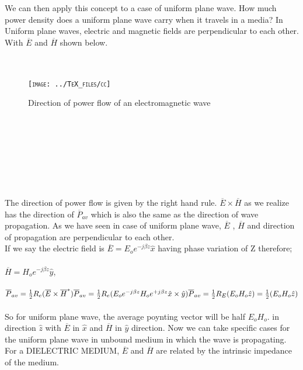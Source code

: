 We can then apply this concept to a case of uniform plane wave. How much power density does a uniform plane wave carry when it travels in a media? In Uniform plane waves, electric and magnetic fields are perpendicular to each other. With $ \overline{E} $ and $ \overline{H} $ shown below.\\\\\\ \begin{figure}[h]
	\centering
	\textsc{\texttt{[image: ../TeX\_files/cc]}}
	\vspace{-10pt}
	\caption{Direction of power flow of an electromagnetic wave}
\end{figure}\\\\\\\\\\\\\\The direction of power flow is given by the right hand rule. $ \overline{E}\times\overline{H} $ as we realize has the direction of $ \overline{P}_{av} $ which is also the same as the direction of wave propagation. As we have seen in case of uniform plane wave, $ \overline{E} $ , $ \overline{H} $ and direction of propagation are perpendicular to each other.\\If we say the electric field is $ \overline{E}=E_{o}e^{-j\beta z}\hat{x} $ having phase variation of Z therefore;\\\\
 $ \overline{H}=H_{o}e^{-j\beta z}\hat{y} $,\\\\ $ \overline{P}_{av}=\frac{1}{2}R_{e}(\overline{E}\times\overline{H}^{*})\\\overline{P}_{av}=\frac{1}{2}R_{e}(E_{o}e^{-j\beta z}H_{o}e^{+j\beta z}\hat{x}\times\hat{y})\\\overline{P}_{av}=\frac{1}{2}R_{E}(E_{o}H_{o}\hat{z})=\frac{1}{2}(E_{o}H_{o}\hat{z}) $\\\\So for uniform plane wave, the average poynting vector will be half $ E_{o}H_{o} $. in direction $ \hat{z} $ with $ \overline{E} $ in $ \hat{x} $ and $ \overline{H} $ in $ \hat{y} $ direction.
Now we can take specific cases for the uniform plane wave in unbound medium in which the wave is propagating. For a DIELECTRIC MEDIUM, $ \overline{E} $ and $ \overline{H} $ are related by the intrinsic impedance of the medium.\\\\
